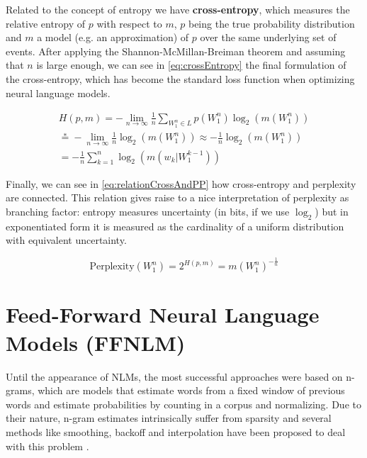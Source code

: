 Related to the concept of entropy we have \textbf{cross-entropy}, which measures the relative entropy of $p$ with respect to $m$, $p$ being the true probability distribution and $m$ a model (e.g. an approximation) of $p$ over the same underlying set of events. After applying the Shannon-McMillan-Breiman theorem and assuming that $n$ is large enough, we can see in \autoref{eq:crossEntropy} the final formulation of the cross-entropy, which has become the standard loss function when optimizing neural language models.

\begin{equation} \label{eq:crossEntropy}
	\begin{gathered}
		H(p,m) = -\lim\limits_{n \rightarrow \infty}\frac{1}{n}\sum_{W_1^n \in L}p(W_1^n)\log_2(m(W_1^n)) \\
		\stackrel{*}{=} -\lim\limits_{n \rightarrow \infty}\frac{1}{n}\log_2(m(W_1^n)) \approx -\frac{1}{n}\log_2(m(W_1^n)) \\
		= -\frac{1}{n}\sum_{k=1}^{n}\log_2(m(w_k|W_{1}^{k-1}))
	\end{gathered}
\end{equation}

Finally, we can see in \autoref{eq:relationCrossAndPP} how cross-entropy and perplexity are connected. This relation gives raise to a nice interpretation of perplexity as branching factor: entropy measures uncertainty (in bits, if we use $\log_2$) but in exponentiated form it is measured as the cardinality of a uniform distribution with equivalent uncertainty.

\begin{equation} \label{eq:relationCrossAndPP}
	\text{Perplexity}(W_1^n) = 2^{H(p,m)} = m(W_1^n)^{-\frac{1}{n}}
\end{equation}

\section{Feed-Forward Neural Language Models (FFNLM)}
\label{sec:forwardnlm}

Until the appearance of NLMs, the most successful approaches were based on n-grams, which are models that estimate words from a fixed window of previous words and estimate probabilities by counting in a corpus and normalizing. Due to their nature, n-gram estimates intrinsically suffer from sparsity and several methods like smoothing, backoff and interpolation have been proposed to deal with this problem \cite{chen1996empirical}.

